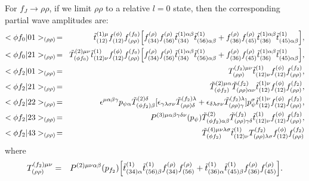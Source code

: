 For $f_J\to\rho\rho$, if we limit $\rho\rho$ to a relative $l=0$
state, then the corresponding partial wave amplitudes are:
\begin{eqnarray}
<\phi f_0|01>_{(\rho\rho)} \!&=&\! \tilde t^{(1)\mu}_{(12)}
f_{(12)}^{(\phi)}f_{(\rho\rho)}^{(f_0)}
\Bigl[f^{(\rho)}_{(34)}f^{(\rho)}_{(56)}\tilde
t^{(1)\alpha\beta}_{(34)} \tilde t^{(1)}_{(56)\alpha\beta}
+f^{(\rho)}_{(36)}f^{(\rho)}_{(45)}\tilde
t^{(1)\alpha\beta}_{(36)}
\tilde t^{(1)}_{(45)\alpha\beta}\Bigr],\\
<\phi f_0|21>_{(\rho\rho)} \!&=&\! \tilde T^{(2)\mu\nu}_{(\phi
f_0)} \tilde t^{(1)}_{(12)\nu} f_{(12)}^{(\phi)}
f_{(\rho\rho)}^{(f_0)}
\Bigl[f^{(\rho)}_{(34)}f^{(\rho)}_{(56)}\tilde
t^{(1)\alpha\beta}_{(34)} \tilde t^{(1)}_{(56)\alpha\beta}
+f^{(\rho)}_{(36)}f^{(\rho)}_{(45)}\tilde
t^{(1)\alpha\beta}_{(36)}
\tilde t^{(1)}_{(45)\alpha\beta}\Bigr] ,  \\
<\phi f_2|01>_{(\rho\rho)} \!&=&\! T^{(f_2)\mu\nu}_{(\rho\rho)}
\tilde t^{(1)}_{(12)\nu} f_{(12)}^{(\phi)}f_{(\rho\rho)}^{(f_2)} , \\
<\phi f_2|21>_{(\rho\rho)} \!&=&\! \tilde T^{(2)\mu\alpha}_{(\phi
f_2)} \tilde T^{(f_2)}_{(\rho\rho)\alpha\nu}\tilde
t^{(1)\nu}_{(12)}
f_{(12)}^{(\phi)} f_{(\rho\rho)}^{(f_2)}, \\
<\phi f_2|22>_{(\rho\rho)} \!&=&\! \epsilon^{\mu\alpha\beta\gamma}
p_{\psi\alpha} \tilde T^{(2)\delta}_{(\phi f_2)\beta}
[\epsilon_{\gamma\lambda\sigma\nu} \tilde
T^{(f_2)\lambda}_{(\rho\rho)\delta}
+\epsilon_{\delta\lambda\sigma\nu} \tilde
T^{(f_2)\lambda}_{(\rho\rho)\gamma}]p_\psi^\sigma \tilde
t^{(1)\nu}_{(12)}
f_{(12)}^{(\phi)}f_{(\rho\rho)}^{(f_2)}, \\
<\phi f_2|23>_{(\rho\rho)} \!&=&\!
P^{(3)\mu\alpha\beta\gamma\delta\nu}(p_\psi) \tilde T^{(2)}_{(\phi
f_2)\alpha\beta} \tilde T^{(f_2)}_{(\rho\rho)\gamma\delta} \tilde
t^{(1)}_{(12)\nu}f_{(12)}^{(\phi)}f_{(\rho\rho)}^{(f_2)}, \\
<\phi f_2|43>_{(\rho\rho)} \!&=&\! \tilde
T^{(4)\mu\nu\lambda\sigma}_{(\phi f_2)}
        \tilde t^{(1)}_{(12)\nu} T^{(f_2)}_{(\rho\rho)\lambda\sigma}
f_{(12)}^{(\phi)}f_{(\rho\rho)}^{(f_2)}
\end{eqnarray}
where
\begin{eqnarray}
T^{(f_2)\mu\nu}_{(\rho\rho)} &=& P^{(2)\mu\nu\alpha\beta}(p_{f_2})
\Bigl[\tilde t^{(1)}_{(34)\alpha}\tilde t^{(1)}_{(56)\beta}
f^{(\rho)}_{(34)}f^{(\rho)}_{(56)} + \tilde
t^{(1)}_{(36)\alpha}\tilde t^{(1)}_{(45)\beta}
f^{(\rho)}_{(36)}f^{(\rho)}_{(45)}\Bigr].
\end{eqnarray}


